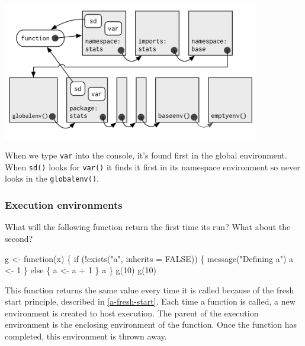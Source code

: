 \documentclass[oneside]{book}
\newenvironment{Shaded}{}{}
\newcommand{\KeywordTok} [1]{\textcolor[rgb]{0.00,0.44,0.13}{{#1}}}
\newcommand{\DataTypeTok}[1]{\textcolor[rgb]{0.56,0.13,0.00}{{#1}}}
\newcommand{\DecValTok}  [1]{\textcolor[rgb]{0.25,0.63,0.44}{{#1}}}
\newcommand{\StringTok}  [1]{\textcolor[rgb]{0.25,0.44,0.63}{{#1}}}
\newcommand{\OtherTok}   [1]{\textcolor[rgb]{0.00,0.44,0.13}{{#1}}}
\newcommand{\NormalTok}  [1]{{#1}}
\renewcommand{\hyperref}[2][???]{\autoref{#1}}
\begin{document}
\includegraphics[width=4.43in,height=2.36in]{diagrams/environments.png/namespace.png}

When we type \texttt{var} into the console, it's found first in the
global environment. When \texttt{sd()} looks for \texttt{var()} it finds
it first in its namespace environment so never looks in the
\texttt{globalenv()}.

\subsubsection{Execution environments}\label{execution-environments}

What will the following function return the first time its run? What
about the second?

\begin{Shaded}
\begin{Highlighting}[]
\NormalTok{g <-}\StringTok{ }\NormalTok{function(x) \{}
  \NormalTok{if (!}\KeywordTok{exists}\NormalTok{(}\StringTok{"a"}\NormalTok{, }\DataTypeTok{inherits =} \OtherTok{FALSE}\NormalTok{)) \{}
    \KeywordTok{message}\NormalTok{(}\StringTok{"Defining a"}\NormalTok{)}
    \NormalTok{a <-}\StringTok{ }\DecValTok{1}
  \NormalTok{\} else \{}
    \NormalTok{a <-}\StringTok{ }\NormalTok{a +}\StringTok{ }\DecValTok{1}
  \NormalTok{\}}
  \NormalTok{a}
\NormalTok{\}}
\KeywordTok{g}\NormalTok{(}\DecValTok{10}\NormalTok{)}
\KeywordTok{g}\NormalTok{(}\DecValTok{10}\NormalTok{)}
\end{Highlighting}
\end{Shaded}

This function returns the same value every time it is called because of
the fresh start principle, described in \hyperref[a-fresh-start]{a fresh
start}. Each time a function is called, a new environment is created to
host execution. The parent of the execution environment is the enclosing
environment of the function. Once the function has completed, this
environment is thrown away.
\end{document}

